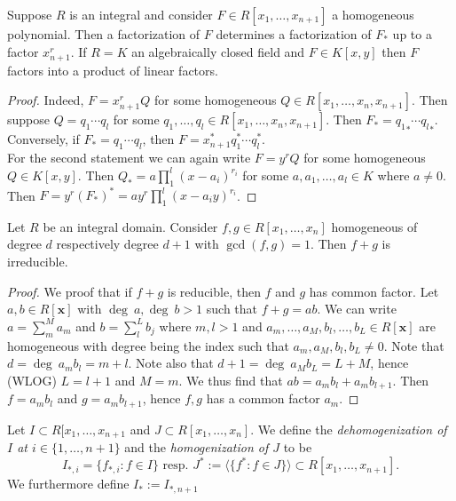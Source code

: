 \begin{corollary}\label{LinearFactoringOfForms}
    Suppose $R$ is an integral and consider $F\in R[x_1,\dots,x_{n+1}]$ a homogeneous polynomial. Then a factorization of $F$ determines a factorization of $F_\ast$ up to a factor $x_{n+1}^r$. If $R=K$ an algebraically closed field and $F\in K[x,y]$ then $F$ factors into a product of linear factors.  
\end{corollary}
\begin{proof}
    Indeed, $F=x_{n+1}^rQ$ for some homogeneous $Q\in R[x_1,\dots,x_n,x_{n+1}]$. Then suppose $Q=q_1\cdots q_l$ for some $q_1,\dots,q_l\in R[x_1,\dots,x_n,x_{n+1}]$. Then $F_\ast = {q_1}_\ast \cdots {q_l}_\ast$. Conversely, if $F_\ast=q_1\cdots q_l$, then $F=x_{n+1}^\ast q_1^\ast\cdots q_l^\ast$.\\
    For the second statement we can again write $F=y^rQ$ for some homogeneous $Q\in K[x,y]$. Then $Q_\ast = a\prod_1^l(x-a_i)^{r_i}$ for some $a,a_1,\dots,a_l\in K$ where $a\neq0$. Then $F=y^r(F_\ast)^\ast = ay^r\prod_1^l (x-a_iy)^{r_i}$.
\end{proof}
\begin{proposition}\label{SumsOfCoprimeHomogeneousPolynomialOfConsecutiveDegree}
    Let $R$ be an integral domain. Consider $f,g\in R[x_1,\dots,x_n]$ homogeneous of degree $d$ respectively degree $d+1$ with $\gcd(f,g)=1$. Then $f+g$ is irreducible.
\end{proposition}
\begin{proof}
    We proof that if $f+g$ is reducible, then $f$ and $g$ has common factor. Let $a,b\in R[\mathbf{x}]$ with $\deg \ a, \deg \ b>1$ such that $f+g=ab$. We can write $a = \sum_m^M a_m$ and $b=\sum_l^L b_j$ where $m,l>1$ and $a_m,\dots,a_M,b_l,\dots,b_L\in R[\mathbf{x}]$ are homogeneous with degree being the index such that $a_m,a_M,b_l,b_L\neq 0$. Note that $d= \deg\ a_mb_l = m+l$. Note also that $d+1=\deg\ a_Mb_L = L+M$, hence (WLOG) $L=l+1$ and $M=m$. We thus find that $ab=a_mb_l+a_mb_{l+1}$. Then $f=a_mb_l$ and $g=a_mb_{l+1}$, hence $f,g$ has a common factor $a_m$. 
\end{proof}
\begin{definition}\label{(De)HomogenizationOfIdeals}
    Let $I\subset R[x_1,\dots,x_{n+1}$ and $J\subset R[x_1,\dots,x_n]$. We define the \textit{dehomogenization of $I$ at $i\in\{1,\dots,n+1\}$} and the \textit{homogenization of $J$} to be 
    $$I_{\ast,i} = \{ f_{\ast,i} : f\in I\} \text{ resp. } J^\ast := \langle\{f^\ast : f \in J\}\rangle \subset R[x_1,\dots,x_{n+1}].$$
    We furthermore define $I_\ast := I_{\ast, n+1}$
\end{definition}
